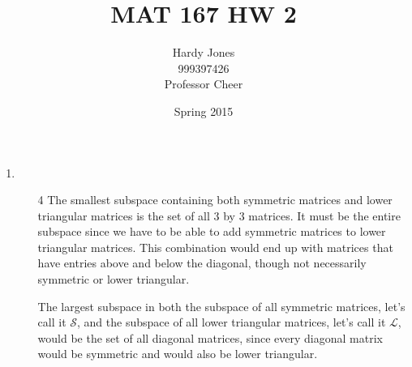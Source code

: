 \documentclass[12pt,letterpaper]{article}
\title{MAT 167 HW 2\vspace{-2ex}}
\author{Hardy Jones\\
        999397426\\
        Professor Cheer\vspace{-2ex}}
\date{Spring 2015}
\begin{document}
  \maketitle

  \begin{enumerate}[label=\S 2.\arabic*]
    \item
      \begin{enumerate}
        \item [4]
          The smallest subspace containing both symmetric matrices and lower triangular matrices is the set of all 3 by 3 matrices.
          It must be the entire subspace since we have to be able to add symmetric matrices to lower triangular matrices. This combination would end up with matrices that have entries above and below the diagonal, though not necessarily symmetric or lower triangular.

          The largest subspace in both the subspace of all symmetric matrices, let's call it $\mathcal{S}$, and the subspace of all lower triangular matrices, let's call it $\mathcal{L}$, would be the set of all diagonal matrices, since every diagonal matrix would be symmetric and would also be lower triangular.


\end{enumerate}
\end{enumerate}
\end{document}
